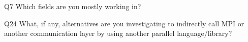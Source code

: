\begin{description}%
\item{Q7} Which fields are you mostly working in?%
\item{Q24} What, if any, alternatives are you investigating to indirectly call MPI or another communication layer by using another parallel language/library?%
\end{description}%
